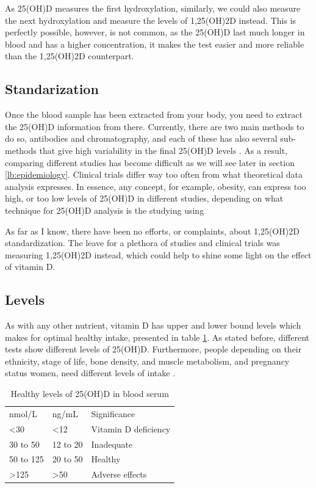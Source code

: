 As 25(OH)D measures the first hydroxylation, similarly, we could also measure the next hydroxylation and measure the levels of 1,25(OH)2D instead. This is perfectly possible, however, is not common, as the 25(OH)D last much longer in blood and has a higher concentration, it makes the test easier and more reliable than the 1,25(OH)2D counterpart.

\subsection{Standarization}
\label{vitd:vdsp}

Once the blood sample has been extracted from your body, you need to extract the 25(OH)D information from there. Currently, there are two main methods to do so, antibodies and chromatography, and each of these has also several sub-methods that give high variability in the final 25(OH)D levels \cite{ref:Wise2021}. As a result, comparing different studies has become difficult as we will see later in section \ref{lb:epidemiology}. Clinical trials differ way too often from what theoretical data analysis expresses. In essence, any concept, for example, obesity, can express too high, or too low levels of 25(OH)D in different studies, depending on what technique for 25(OH)D analysis is the studying using \cite{ref:Sempos2018, ref:LeFevre2015}

As far as I know, there have been no efforts, or complaints, about 1,25(OH)2D standardization. The leave for a plethora of studies and clinical trials was measuring 1,25(OH)2D instead, which could help to shine some light on the effect of vitamin D.

\subsection{Levels}

As with any other nutrient, vitamin D has upper and lower bound levels which makes for optimal healthy intake, presented in table \ref{tab:vitDLevels}. As stated before, different tests show different levels of 25(OH)D. Furthermore, people depending on their ethnicity, stage of life, bone density, and muscle metabolism, and pregnancy status women, need different levels of intake \cite{ref:Holick2011, ref:Holick2007, ref:Rosen2012, ref:Brown2018}.

\begin{table}[h!]
    \caption{Healthy levels of 25(OH)D in blood serum}
	\centering	
	\begin{tabular}{|l|l|l|} 
		\hline
		\rowcolor[rgb]{1,0.392,0.392} nmol/L & ng/mL    & Significance           \\ 
		\cline{1-2}
		<30          & <12       & Vitamin D deficiency  \\
		30 to 50     & 12 to 20  & Inadequate            \\
		50 to 125    & 20 to 50  & Healthy               \\
		>125         & >50       & Adverse effects       \\     
		\hline
	\end{tabular}
	\label{tab:vitDLevels}
\end{table}


